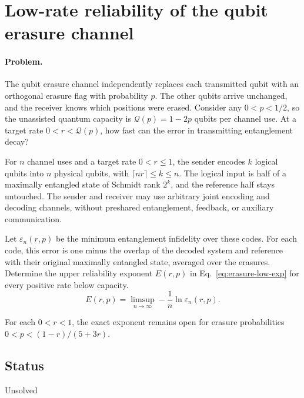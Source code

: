 \section{Low-rate reliability of the qubit erasure channel}
\label{sec:op_ebdd8afcc5dfa08c}

\paragraph{Problem.}
The qubit erasure channel independently replaces each transmitted qubit with an orthogonal erasure flag with probability $p$. The other qubits arrive unchanged, and the receiver knows which positions were erased. Consider any $0<p<1/2$, so the unassisted quantum capacity is $\mathcal{Q}(p)=1-2p$ qubits per channel use. At a target rate $0<r<\mathcal{Q}(p)$, how fast can the error in transmitting entanglement decay?

For $n$ channel uses and a target rate $0<r\leq 1$, the sender encodes $k$ logical qubits into $n$ physical qubits, with $\lceil nr\rceil\leq k\leq n$. The logical input is half of a maximally entangled state of Schmidt rank $2^k$, and the reference half stays untouched. The sender and receiver may use arbitrary joint encoding and decoding channels, without preshared entanglement, feedback, or auxiliary communication.

Let $\varepsilon_n(r,p)$ be the minimum entanglement infidelity over these codes. For each code, this error is one minus the overlap of the decoded system and reference with their original maximally entangled state, averaged over the erasures. Determine the upper reliability exponent $E(r,p)$ in Eq.~\eqref{eq:erasure-low-exp} for every positive rate below capacity.
\begin{equation}
 E(r,p)=\limsup_{n\to\infty}-\frac{1}{n}\ln\varepsilon_n(r,p).
 \label{eq:erasure-low-exp}
\end{equation}

For each $0<r<1$, the exact exponent remains open for erasure probabilities $0<p<(1-r)/(5+3r)$.

\subsection*{Status}

Unsolved

